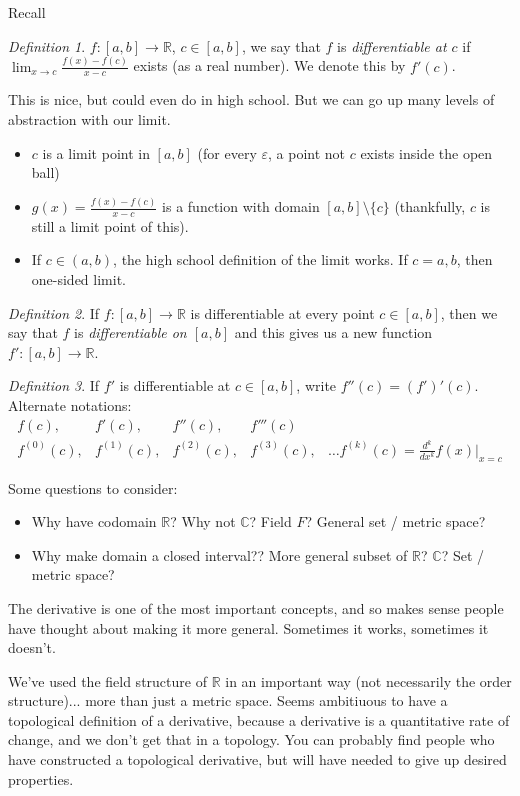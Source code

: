 \documentclass{article}
\theoremstyle{plain}
\theoremstyle{remark}
\newtheorem{definition}{Definition}
\newcommand{\R}{{\mathbb R}}
\newcommand{\C}{{\mathbb C}}
\newcommand{\ep}{{\varepsilon}}
\begin{document}
Recall
\begin{definition}
	$f \colon [a,b] \to \R$, $c \in [a,b]$, we say that $f$
	is \emph{differentiable at $c$} if
	$\lim_{x \to c} \frac{f(x) - f(c)}{x-c}$ exists (as a real number).
	We denote this by $f'(c)$.
\end{definition}
This is nice, but could even do in high school.
But we can go up many levels of abstraction with our limit.
\begin{itemize}
	\item $c$ is a limit point in $[a,b]$
		(for every $\ep$, a point not $c$ exists inside the open ball)
	\item $g(x) = \frac{f(x) - f(c)}{x-c}$ is a function with
		domain $[a,b] \setminus \{c\}$ (thankfully, $c$ is still a limit point of this).
	\item If $c \in (a,b)$, the high school definition of the limit works.
		If $c = a,b$, then one-sided limit.
\end{itemize}
\begin{definition}
	If $f \colon [a,b] \to \R$ is differentiable at every point $c \in [a,b]$,
	then we say that $f$ is \emph{differentiable on $[a,b]$}
	and this gives us a new function $f' \colon [a,b] \to \R$.
\end{definition}
\begin{definition}
	If $f'$ is differentiable at $c \in [a,b]$, write $f''(c) = (f')'(c)$.
	Alternate notations:
	\[
		\begin{matrix}
			f(c), & f'(c), & f''(c), & f'''(c)\\
			f^{(0)}(c), & f^{(1)}(c), & f^{(2)}(c), & f^{(3)}(c), &
			\dots f^{(k)}(c) = \frac{d^k}{dx^k} f(x) |_{x=c}
		\end{matrix}
	\]
\end{definition}

Some questions to consider:
\begin{itemize}
	\item Why have codomain $\R$? Why not $\C$? Field $F$? General set / metric space?
	\item Why make domain a closed interval?? More general subset of $\R$? $\C$? Set / metric space?
\end{itemize}
The derivative is one of the most important concepts,
and so makes sense people have thought about making it more general.
Sometimes it works, sometimes it doesn't.

We've used the field structure of $\R$ in an important way
(not necessarily the order structure)...
more than just a metric space.
Seems ambitiuous to have a topological definition of a derivative,
because a derivative is a quantitative rate of change,
and we don't get that in a topology.
You can probably find people who have constructed a topological derivative,
but will have needed to give up desired properties.
\end{document}
